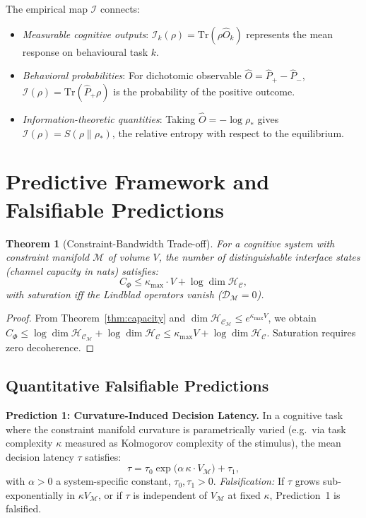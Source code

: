 \documentclass[twocolumn,aps,prd,superscriptaddress,nofootinbib]{revtex4-2}
\newtheorem{theorem}{Theorem}[section]
\newcommand{\HC}{\mathcal{H}_{\mathcal{C}}}
\newcommand{\CM}{\mathcal{M}}
\newcommand{\CD}{\mathcal{D}}
\newcommand{\CI}{\mathcal{I}}
\newcommand{\hatP}{\hat{P}}
\newcommand{\Tr}{\mathrm{Tr}}
\begin{document}
The empirical map $\CI$ connects:
\begin{itemize}
\item \textit{Measurable cognitive outputs}: $\CI_k(\rho) = \Tr(\rho\hat{O}_k)$
      represents the mean response on behavioural task $k$.
\item \textit{Behavioral probabilities}: For dichotomic observable
      $\hat{O} = \hatP_+ - \hatP_-$, $\CI(\rho) = \Tr(\hatP_+\rho)$ is the
      probability of the positive outcome.
\item \textit{Information-theoretic quantities}: Taking
      $\hat{O} = -\log\rho_*$ gives $\CI(\rho) = S(\rho\|\rho_*)$, the
      relative entropy with respect to the equilibrium.
\end{itemize}

\section{Predictive Framework and Falsifiable Predictions}
\label{sec:predictions}

\begin{theorem}[Constraint-Bandwidth Trade-off]
\label{thm:bandwidth}
For a cognitive system with constraint manifold $\CM$ of volume $V$, the number
of distinguishable interface states (channel capacity in nats) satisfies:
\begin{equation}
  C_\Phi \leq \kappa_\mathrm{max} \cdot V + \log\dim\HC,
  \label{eq:bandwidth}
\end{equation}
with saturation iff the Lindblad operators vanish ($\CD_\CM = 0$).
\end{theorem}

\begin{proof}
From Theorem~\ref{thm:capacity} and $\dim\HC_\CM \leq e^{\kappa_\mathrm{max}V}$,
we obtain $C_\Phi \leq \log\dim\HC_\CM + \log\dim\HC \leq \kappa_\mathrm{max}V + \log\dim\HC$.
Saturation requires zero decoherence.
\end{proof}

\subsection{Quantitative Falsifiable Predictions}

\textbf{Prediction 1: Curvature-Induced Decision Latency.}
In a cognitive task where the constraint manifold curvature is parametrically
varied (e.g.\ via task complexity $\kappa$ measured as Kolmogorov complexity of
the stimulus), the mean decision latency $\tau$ satisfies:
\begin{equation}
  \tau = \tau_0 \exp\!\bigl(\alpha\,\kappa \cdot V_\CM\bigr) + \tau_1,
  \label{eq:pred1}
  \tag{P1}
\end{equation}
with $\alpha > 0$ a system-specific constant, $\tau_0, \tau_1 > 0$.
\emph{Falsification:} If $\tau$ grows sub-exponentially in $\kappa V_\CM$, or
if $\tau$ is independent of $V_\CM$ at fixed $\kappa$, Prediction~1 is
falsified.
\end{document}
